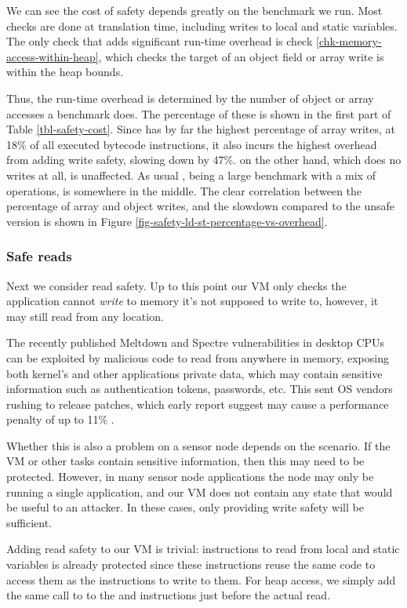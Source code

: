 We can see the cost of safety depends greatly on the benchmark we run. Most checks are done at translation time, including writes to local and static variables. The only check that adds significant run-time overhead is check \ref{chk-memory-access-within-heap}, which checks the target of an object field or array write is within the heap bounds.

Thus, the run-time overhead is determined by the number of object or array accesses a benchmark does. The percentage of these is shown in the first part of Table \ref{tbl-safety-cost}. Since  has by far the highest percentage of array writes, at 18\% of all executed bytecode instructions, it also incurs the highest overhead from adding write safety, slowing down by 47\%.  on the other hand, which does no writes at all, is unaffected. As usual , being a large benchmark with a mix of operations, is somewhere in the middle. The clear correlation between the percentage of array and object writes, and the slowdown compared to the unsafe version is shown in Figure \ref{fig-safety-ld-st-percentage-vs-overhead}.

\subsubsection{Safe reads}
Next we consider read safety. Up to this point our VM only checks the application cannot \emph{write} to memory it's not supposed to write to, however, it may still read from any location.

The recently published Meltdown and Spectre vulnerabilities in desktop CPUs can be exploited by malicious code to read from anywhere in memory, exposing both kernel's and other applications private data, which may contain sensitive information such as authentication tokens, passwords, etc. This sent OS vendors rushing to release patches, which early report suggest may cause a performance penalty of up to 11\% \cite{Simakov:2018wp}.

Whether this is also a problem on a sensor node depends on the scenario. If the VM or other tasks contain sensitive information, then this may need to be protected. However, in many sensor node applications the node may only be running a single application, and our VM does not contain any state that would be useful to an attacker. In these cases, only providing write safety will be sufficient.

Adding read safety to our VM is trivial: instructions to read from local and static variables is already protected since these instructions reuse the same code to access them as the instructions to write to them. For heap access, we simply add the same call to  to the  and  instructions just before the actual read.

